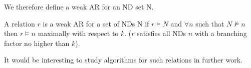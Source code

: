 \medskip

We therefore define a weak AR for an ND set N.

\begin{definition}
\begin{rm}
A relation $r$ is a weak AR for a set of NDs N if $r \models N$ and
$\forall n$ such that $N \not\models n$ then $r \models n$ maximally
with respect to $k$. ($r$ satisfies all NDs $n$ with a branching
factor no higher than $k$).
\end{rm}
\end{definition}

It would be interesting to study algorithms for such relations in
further work. 
